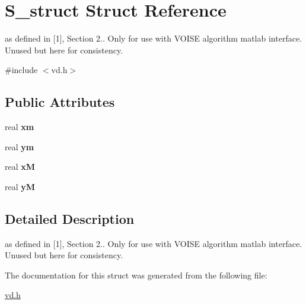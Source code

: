 \hypertarget{structS__struct}{}\section{S\+\_\+struct Struct Reference}
\label{structS__struct}


as defined in \mbox{[}1\mbox{]}, Section 2.. Only for use with V\+O\+I\+SE algorithm matlab interface. Unused but here for consistency.  




{\ttfamily \#include $<$vd.\+h$>$}

\subsection*{Public Attributes}
\begin{DoxyCompactItemize}
\item 
\mbox{\label{structS__struct_a25e8165588324b622784f0a6a192229b}} 
real {\bfseries xm}
\item 
\mbox{\label{structS__struct_a1764528f072024257fb367573b1f96b4}} 
real {\bfseries ym}
\item 
\mbox{\label{structS__struct_a403655f51cb0c6872984d84fa07212d9}} 
real {\bfseries xM}
\item 
\mbox{\label{structS__struct_adcfd9a919530aa86fd28ad1d4d3486d6}} 
real {\bfseries yM}
\end{DoxyCompactItemize}


\subsection{Detailed Description}
as defined in \mbox{[}1\mbox{]}, Section 2.. Only for use with V\+O\+I\+SE algorithm matlab interface. Unused but here for consistency. 

The documentation for this struct was generated from the following file\+:\begin{DoxyCompactItemize}
\item 
\mbox{\hyperlink{vd_8h}{vd.\+h}}\end{DoxyCompactItemize}
